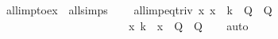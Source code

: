 \begin{isabellebody}
%
\endisatagproof
{\isafoldproof}%
%
\isadelimproof
\isanewline
%
\endisadelimproof
\isanewline
{}\isamarkupfalse%
\ all{\isacharunderscore}imp{\isacharunderscore}to{\isacharunderscore}ex\ {\isacharequal}\ all{\isacharunderscore}simps\ {\isacharparenleft}{}{\isacharparenright}\ \ \isanewline
\isanewline
\isanewline
{}\isamarkupfalse%
\ all{\isacharunderscore}imp{\isacharunderscore}eq{\isacharunderscore}triv{\isacharcolon}\ {\isachardoublequoteopen}{\isacharparenleft}{\isasymforall}x{\isachardot}\ x\ {\isacharequal}\ k\ {\isasymlongrightarrow}\ Q{\isacharparenright}\ {\isacharequal}\ Q{\isachardoublequoteclose}\isanewline
\ \ \ \ \ \ \ \ \ \ \ \ \ \ \ \ \ \ \ \ \ \ \ {\isachardoublequoteopen}{\isacharparenleft}{\isasymforall}x{\isachardot}\ k\ {\isacharequal}\ x\ {\isasymlongrightarrow}\ Q{\isacharparenright}\ {\isacharequal}\ Q{\isachardoublequoteclose}\isanewline
%
\isadelimproof
\ \ %
\endisadelimproof
%
\isatagproof
{}\isamarkupfalse%
\ auto%
\endisatagproof
{\isafoldproof}%
%
\isadelimproof
\isanewline
%
\endisadelimproof
%
\isadelimtheory
\ \ \isanewline
%
\endisadelimtheory
%
\isatagtheory
{}\isamarkupfalse%
%
\endisatagtheory
{\isafoldtheory}%
%
\isadelimtheory
%
\endisadelimtheory
%
\end{isabellebody}%
